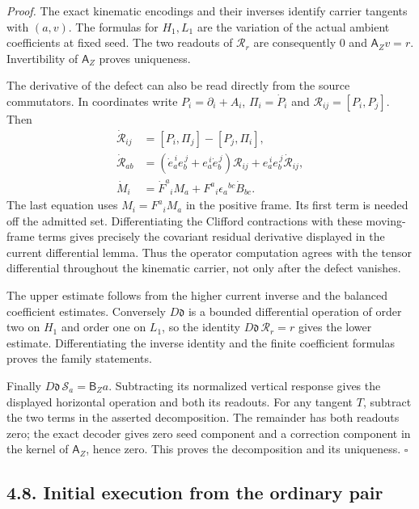 \documentclass[
  english,
  11pt,
  reqno]{amsart}
\begin{document}
\emph{Proof.} The exact kinematic encodings and their inverses identify
carrier tangents with \((a,v)\). The formulas for \(H_1,L_1\) are the
variation of the actual ambient coefficients at fixed seed. The two
readouts of \(\mathscr R_r\) are consequently \(0\) and
\(\mathsf A_Zv=r\). Invertibility of \(\mathsf A_Z\) proves uniqueness.

The derivative of the defect can also be read directly from the source
commutators. In coordinates write \(P_i=\partial_i+A_i\),
\(\Pi_i=\dot P_i\) and \(\mathcal R_{ij}=[P_i,P_j]\). Then \[
\begin{aligned}
\dot{\mathcal R}_{ij}&=[P_i,\Pi_j]-[P_j,\Pi_i],\\
\dot{\mathcal R}_{ab}
&=(\dot e_a^{\,i}e_b^{\,j}+e_a^{\,i}\dot e_b^{\,j})\mathcal R_{ij}
+e_a^{\,i}e_b^{\,j}\dot{\mathcal R}_{ij},\\
\dot M_i&=\dot F^a{}_iM_a+F^a{}_i\epsilon_a{}^{bc}\dot B_{bc}.
\end{aligned}
\] The last equation uses \(M_i=F^a{}_iM_a\) in the positive frame. Its
first term is needed off the admitted set. Differentiating the Clifford
contractions with these moving-frame terms gives precisely the covariant
residual derivative displayed in the current differential lemma. Thus
the operator computation agrees with the tensor differential throughout
the kinematic carrier, not only after the defect vanishes.

The upper estimate follows from the higher current inverse and the
balanced coefficient estimates. Conversely \(D\mathfrak d\) is a bounded
differential operation of order two on \(H_1\) and order one on \(L_1\),
so the identity \(D\mathfrak d\,\mathscr R_r=r\) gives the lower
estimate. Differentiating the inverse identity and the finite
coefficient formulas proves the family statements.

Finally \(D\mathfrak d\,\mathscr S_a=\mathsf B_Za\). Subtracting its
normalized vertical response gives the displayed horizontal operation
and both its readouts. For any tangent \(T\), subtract the two terms in
the asserted decomposition. The remainder has both readouts zero; the
exact decoder gives zero seed component and a correction component in
the kernel of \(\mathsf A_Z\), hence zero. This proves the decomposition
and its uniqueness. \hfill\(\square\)

\subsection{4.8. Initial execution from the ordinary
pair}\label{initial-execution-from-the-ordinary-pair}\label{sec:online-ordinary-source-execution}
\end{document}
